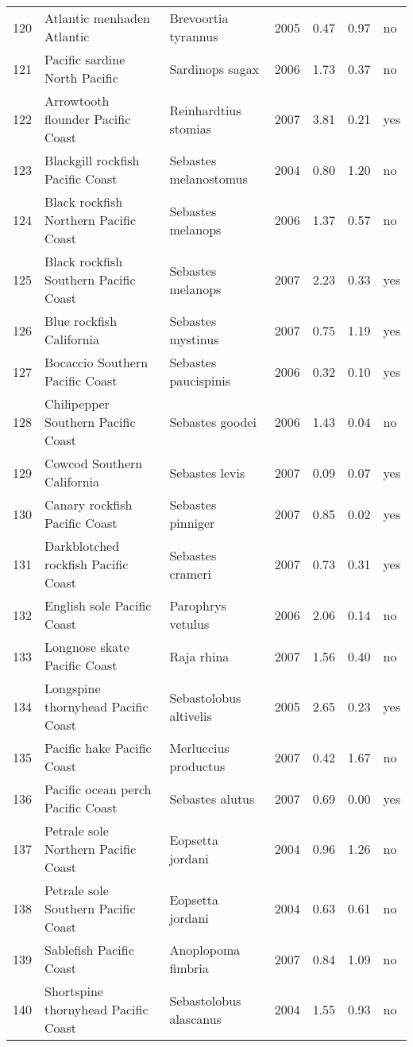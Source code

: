 \begin{table}[ht]
\begin{center}
\begin{tabular}{rllrrrl}
  120 & Atlantic menhaden Atlantic & Brevoortia tyrannus & 2005 & 0.47 & 0.97 & no \\
  121 & Pacific sardine North Pacific & Sardinops sagax & 2006 & 1.73 & 0.37 & no \\
  122 & Arrowtooth flounder Pacific Coast & Reinhardtius stomias & 2007 & 3.81 & 0.21 & yes \\
  123 & Blackgill rockfish  Pacific Coast & Sebastes melanostomus & 2004 & 0.80 & 1.20 & no \\
  124 & Black rockfish Northern Pacific Coast & Sebastes melanops & 2006 & 1.37 & 0.57 & no \\
  125 & Black rockfish Southern Pacific Coast & Sebastes melanops & 2007 & 2.23 & 0.33 & yes \\
  126 & Blue rockfish California & Sebastes mystinus & 2007 & 0.75 & 1.19 & yes \\
  127 & Bocaccio Southern Pacific Coast & Sebastes paucispinis & 2006 & 0.32 & 0.10 & yes \\
  128 & Chilipepper Southern Pacific Coast & Sebastes goodei & 2006 & 1.43 & 0.04 & no \\
  129 & Cowcod Southern California & Sebastes levis & 2007 & 0.09 & 0.07 & yes \\
  130 & Canary rockfish Pacific Coast & Sebastes pinniger & 2007 & 0.85 & 0.02 & yes \\
  131 & Darkblotched rockfish Pacific Coast & Sebastes crameri & 2007 & 0.73 & 0.31 & yes \\
  132 & English sole Pacific Coast & Parophrys vetulus & 2006 & 2.06 & 0.14 & no \\
  133 & Longnose skate Pacific Coast & Raja rhina & 2007 & 1.56 & 0.40 & no \\
  134 & Longspine thornyhead Pacific Coast & Sebastolobus altivelis & 2005 & 2.65 & 0.23 & yes \\
  135 & Pacific hake Pacific Coast & Merluccius productus & 2007 & 0.42 & 1.67 & no \\
  136 & Pacific ocean perch Pacific Coast & Sebastes alutus & 2007 & 0.69 & 0.00 & yes \\
  137 & Petrale sole Northern Pacific Coast & Eopsetta jordani & 2004 & 0.96 & 1.26 & no \\
  138 & Petrale sole Southern Pacific Coast & Eopsetta jordani & 2004 & 0.63 & 0.61 & no \\
  139 & Sablefish Pacific Coast & Anoplopoma fimbria & 2007 & 0.84 & 1.09 & no \\
  140 & Shortspine thornyhead Pacific Coast & Sebastolobus alascanus & 2004 & 1.55 & 0.93 & no \\

\end{tabular}
\end{center}
\end{table}
